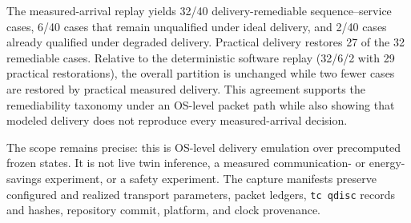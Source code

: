 \documentclass[journal,onecolumn]{IEEEtran}
\begin{document}
The measured-arrival replay yields 32/40 delivery-remediable sequence--service cases, 6/40 cases that remain unqualified under ideal delivery, and 2/40 cases already qualified under degraded delivery. Practical delivery restores 27 of the 32 remediable cases. Relative to the deterministic software replay (32/6/2 with 29 practical restorations), the overall partition is unchanged while two fewer cases are restored by practical measured delivery. This agreement supports the remediability taxonomy under an OS-level packet path while also showing that modeled delivery does not reproduce every measured-arrival decision.

The scope remains precise: this is OS-level delivery emulation over precomputed frozen states. It is not live twin inference, a measured communication- or energy-savings experiment, or a safety experiment. The capture manifests preserve configured and realized transport parameters, packet ledgers, \texttt{tc qdisc} records and hashes, repository commit, platform, and clock provenance.
\end{document}
